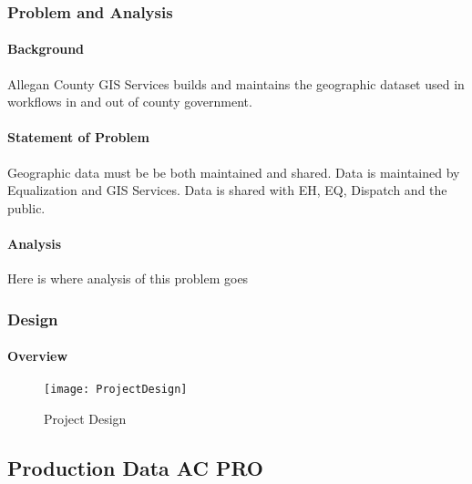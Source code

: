 %
%
\subsubsection{Problem and Analysis}
%
\begin{adjmulticols}{2}{\innerMar}{\outerMar}
\paragraph{Background}
%
\noindent Allegan County GIS Services builds and maintains the geographic dataset used in workflows in and out of county government.
%
\paragraph{Statement of Problem}
%
\noindent Geographic data must be be both maintained and shared.  Data is maintained by Equalization and GIS Services.  Data is shared with EH, EQ, Dispatch and the public.
%
\paragraph{Analysis}
%
\noindent Here is where analysis of this problem goes
%
\end{adjmulticols}
%
\clearpage
\subsubsection{Design}

\paragraph[Overview]{Overview}


%
\vspace{-.2in}

\begin{figure}[h!]
\centering
    \texttt{[image: ProjectDesign]}
\vspace{-.2in}

\caption{Project Design}
\end{figure}
\clearpage








\subsection[Production Data]{Production Data AC PRO}
\medskip








